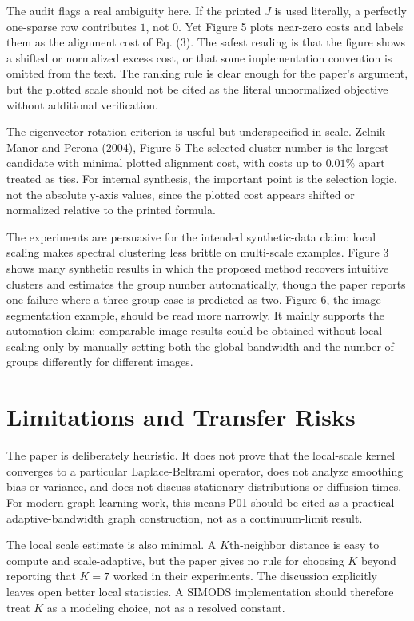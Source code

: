 \documentclass[11pt]{article}
\begin{document}
The audit flags a real ambiguity here. If the printed \(J\) is used literally,
a perfectly one-sparse row contributes \(1\), not \(0\). Yet Figure 5 plots
near-zero costs and labels them as the alignment cost of Eq. (3). The safest
reading is that the figure shows a shifted or normalized excess cost, or that
some implementation convention is omitted from the text. The ranking rule is
clear enough for the paper's argument, but the plotted scale should not be
cited as the literal unnormalized objective without additional verification.

{The eigenvector-rotation criterion is useful but underspecified in scale.}
{Zelnik-Manor and Perona (2004), Figure 5}
{The selected cluster number is the largest candidate with minimal plotted
alignment cost, with costs up to \(0.01\%\) apart treated as ties. For
internal synthesis, the important point is the selection logic, not the
absolute y-axis values, since the plotted cost appears shifted or normalized
relative to the printed formula.}

The experiments are persuasive for the intended synthetic-data claim: local
scaling makes spectral clustering less brittle on multi-scale examples. Figure
3 shows many synthetic results in which the proposed method recovers intuitive
clusters and estimates the group number automatically, though the paper
reports one failure where a three-group case is predicted as two. Figure 6,
the image-segmentation example, should be read more narrowly. It mainly
supports the automation claim: comparable image results could be obtained
without local scaling only by manually setting both the global bandwidth and
the number of groups differently for different images.

\FloatBarrier

\section{Limitations and Transfer Risks}

The paper is deliberately heuristic. It does not prove that the local-scale
kernel converges to a particular Laplace-Beltrami operator, does not analyze
smoothing bias or variance, and does not discuss stationary distributions or
diffusion times. For modern graph-learning work, this means P01 should be
cited as a practical adaptive-bandwidth graph construction, not as a
continuum-limit result.

The local scale estimate is also minimal. A \(K\)th-neighbor distance is easy
to compute and scale-adaptive, but the paper gives no rule for choosing \(K\)
beyond reporting that \(K=7\) worked in their experiments. The discussion
explicitly leaves open better local statistics. A SIMODS implementation should
therefore treat \(K\) as a modeling choice, not as a resolved constant.
\end{document}
